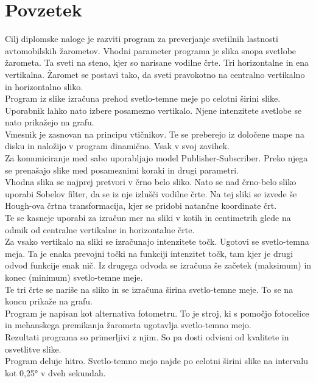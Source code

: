 \documentclass[oneside, a4paper, 12pt]{book}
\renewcommand{\chaptermark}[1]%
{\markboth{\MakeUppercase{\thechapter.\ #1}}{}} \renewcommand{\sectionmark}[1]%
\newcommand{\clearemptydoublepage}{\newpage{\pagestyle{empty}\cleardoublepage}}
\begin{document}
\clearemptydoublepage

\chapter*{Povzetek}
\chaptermark{}
Cilj diplomske naloge je razviti program za preverjanje svetilnih lastnosti avtomobilskih žarometov. Vhodni parameter programa je slika snopa svetlobe žarometa. Ta sveti na steno, kjer so narisane vodilne črte. Tri horizontalne in ena vertikalna. Žaromet se postavi tako, da sveti pravokotno na centralno vertikalno in horizontalno sliko. \\
Program iz slike izračuna prehod svetlo-temne meje po celotni širini slike. Uporabnik lahko nato izbere posamezno vertikalo. Njene intenzitete svetlobe se nato prikažejo na grafu.\\
Vmesnik je zasnovan na principu vtičnikov. Te se preberejo iz določene mape na disku in naložijo v program dinamično. Vsak v svoj zavihek.\\
Za komuniciranje med sabo uporabljajo model Publisher-Subscriber. Preko njega se prenašajo slike med posameznimi koraki in drugi parametri.\\
Vhodna slika se najprej pretvori v črno belo sliko. Nato se nad črno-belo sliko uporabi Sobelov filter, da se iz nje izlušči vodilne črte. Na tej sliki se izvede še Hough-ova črtna transformacija, kjer se pridobi natančne koordinate črt.\\
Te se kasneje uporabi za izračun mer na sliki v kotih in centimetrih glede na odmik od centralne vertikalne in horizontalne črte.\\
Za vsako vertikalo na sliki se izračunajo intenzitete točk. Ugotovi se svetlo-temna meja. Ta je enaka prevojni točki na funkciji intenzitet točk, tam kjer je drugi odvod funkcije enak nič. Iz drugega odvoda se izračuna še začetek (maksimum) in konec (minimum) svetlo-temne meje.\\
Te tri črte se nariše na sliko in se izračuna širina svetlo-temne meje. To se na koncu prikaže na grafu.\\
Program je napisan kot alternativa fotometru. To je stroj, ki s pomočjo fotocelice in mehanskega premikanja žarometa ugotavlja svetlo-temno mejo.\\
Rezultati programa so primerljivi z njim. So pa dosti odvisni od kvalitete in osvetlitve slike.\\
Program deluje hitro. Svetlo-temno mejo najde po celotni širini slike na intervalu kot 0,25° v dveh sekundah.
\clearemptydoublepage
\end{document}

